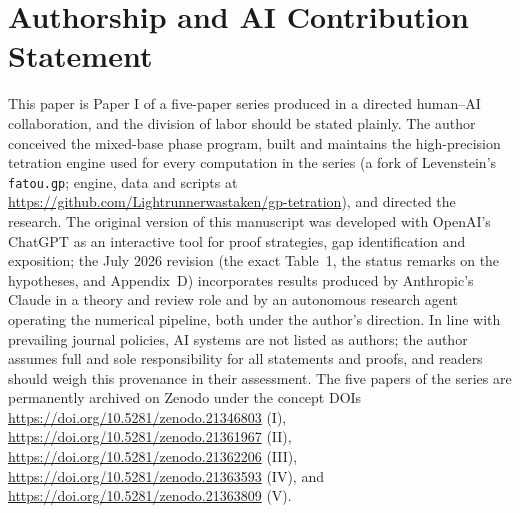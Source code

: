 \documentclass[11pt,a4paper]{article}
\theoremstyle{plain}
\theoremstyle{definition}
\theoremstyle{remark}
\begin{document}
\section*{Authorship and AI Contribution Statement}
This paper is Paper I of a five-paper series produced in a directed human--AI collaboration, and the division of labor should be stated plainly. The author conceived the mixed-base phase program, built and maintains the high-precision tetration engine used for every computation in the series (a fork of Levenstein's \texttt{fatou.gp}; engine, data and scripts at \url{https://github.com/Lightrunnerwastaken/gp-tetration}), and directed the research. The original version of this manuscript was developed with OpenAI's ChatGPT as an interactive tool for proof strategies, gap identification and exposition; the July 2026 revision (the exact Table~1, the status remarks on the hypotheses, and Appendix~D) incorporates results produced by Anthropic's Claude in a theory and review role and by an autonomous research agent operating the numerical pipeline, both under the author's direction. In line with prevailing journal policies, AI systems are not listed as authors; the author assumes full and sole responsibility for all statements and proofs, and readers should weigh this provenance in their assessment. The five papers of the series are permanently archived on Zenodo under the concept DOIs \url{https://doi.org/10.5281/zenodo.21346803} (I), \url{https://doi.org/10.5281/zenodo.21361967} (II), \url{https://doi.org/10.5281/zenodo.21362206} (III), \url{https://doi.org/10.5281/zenodo.21363593} (IV), and \url{https://doi.org/10.5281/zenodo.21363809} (V).
\end{document}
